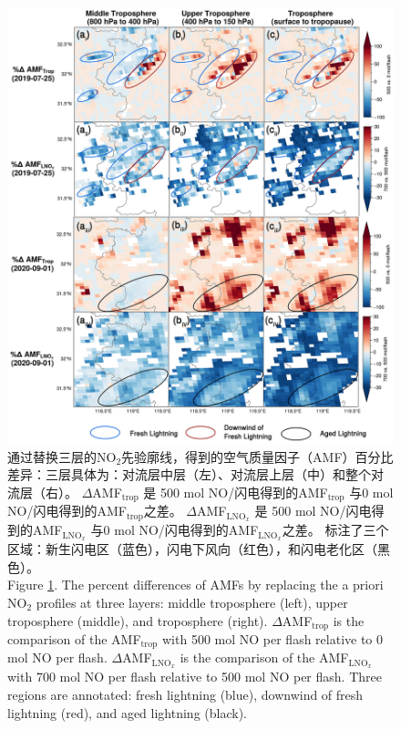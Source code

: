 \begin{figure}[!htbp]
    \centering
    \includegraphics[width=12cm]{./figures/s5p_amf_diff.png}
    \caption{
    通过替换三层的NO$_2$先验廓线，得到的空气质量因子（AMF）百分比差异：三层具体为：对流层中层（左）、对流层上层（中）和整个对流层（右）。
     $\Delta$AMF$_\textrm{trop}$ 是 500 mol NO/闪电得到的AMF$_\textrm{trop}$ 与0 mol NO/闪电得到的AMF$_\textrm{trop}$之差。
     $\Delta$AMF$_\textrm{LNO$_x$}$ 是 500 mol NO/闪电得到的AMF$_\textrm{LNO$_x$}$ 与0 mol NO/闪电得到的AMF$_\textrm{LNO$_x$}$之差。
     标注了三个区域：新生闪电区（蓝色），闪电下风向（红色），和闪电老化区（黑色）。\\
    Figure \ref{fig:s5p_amf_diff}. The percent differences of AMFs by replacing the a priori NO$_2$ profiles at three layers:
    middle troposphere (left), upper troposphere (middle), and troposphere (right).
    $\Delta$AMF$_\textrm{trop}$ is the comparison of the AMF$_\textrm{trop}$ with 500 mol NO per flash relative to 0 mol NO per flash.
    $\Delta$AMF$_\textrm{LNO$_x$}$ is the comparison of the AMF$_\textrm{LNO$_x$}$ with 700 mol NO per flash relative to 500 mol NO per flash.
    Three regions are annotated: fresh lightning (blue),
    downwind of fresh lightning (red),
    and aged lightning (black).
    }
    \label{fig:s5p_amf_diff}
\end{figure}


